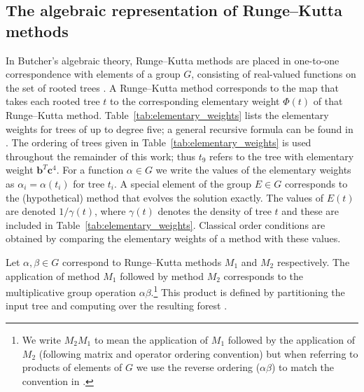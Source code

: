 \subsection{The algebraic representation of Runge--Kutta methods}\label{subsec:Algebraic_representation}

In Butcher's algebraic theory, Runge--Kutta methods
are placed in one-to-one correspondence with elements of a group
$G$, consisting of real-valued functions on the set of rooted trees \cite{Butcher2008_book}.
A Runge--Kutta method corresponds to the map that takes each rooted tree $t$
to the corresponding elementary weight $\Phi(t)$ of that Runge--Kutta method.
Table~\ref{tab:elementary_weights} lists the elementary weights for trees of
up to degree five; a general recursive formula can be found in
\cite[Definition 312A]{Butcher2008_book}.
The ordering of trees given in Table~\ref{tab:elementary_weights} is used
throughout the remainder of this work; thus $t_9$ refers to the tree with
elementary weight $\bm{b}^T \bm{c}^4$.
For a function $\alpha \in G$ we write the values of the
elementary weights as $\alpha_{i} = \alpha(t_{i})$ for tree $t_{i}$.
A special element of the group $E \in G$ corresponds to the
(hypothetical) method that evolves the solution exactly.
The values of $E(t)$ are denoted $1/\gamma(t)$, where $\gamma(t)$ denotes 
the density of tree $t$ \cite{Butcher2008_book} and these are included in
Table~\ref{tab:elementary_weights}.
Classical order conditions are obtained by comparing the elementary weights 
of a method with these values.

Let $\alpha, \beta \in G$ correspond to Runge--Kutta methods $M_1$ and $M_2$
respectively.
The application of method $M_1$ followed by method $M_2$ corresponds to
the multiplicative group operation $\alpha\beta$.\footnote{We write
	$M_2M_1$ to mean the application of $M_1$
	followed by the application of $M_2$
	(following matrix and operator ordering convention)
	but when referring to products of elements of $G$
        we use the reverse ordering ($\alpha\beta$)
	to match the convention in \cite{Butcher2008_book}.}
This product is defined by partitioning the input tree and computing
over the resulting forest \cite[\S~383]{Butcher2008_book}.

